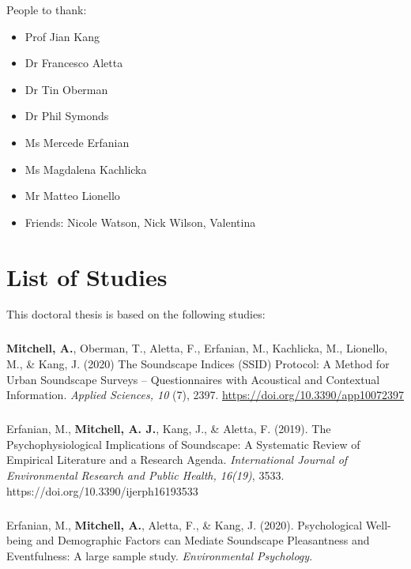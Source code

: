 \documentclass[oneside,fontsize=13pt,titlepage]{scrbook}
\begin{document}
People to thank:
\begin{itemize}
      \item Prof Jian Kang
      \item Dr Francesco Aletta
      \item Dr Tin Oberman
      \item Dr Phil Symonds
      \item Ms Mercede Erfanian
      \item Ms Magdalena Kachlicka
      \item Mr Matteo Lionello
      \item Friends: Nicole Watson, Nick Wilson, Valentina
\end{itemize}

\chapter*{List of Studies}

This doctoral thesis is based on the following studies:

\paragraph*{}
\textbf{Mitchell, A.}, Oberman, T., Aletta, F., Erfanian, M., Kachlicka, M., Lionello, M., \& Kang, J. (2020) The Soundscape Indices (SSID) Protocol: A Method for Urban Soundscape Surveys -- Questionnaires with Acoustical and Contextual Information. \emph{Applied Sciences, 10} (7), 2397. \url{https://doi.org/10.3390/app10072397}

\paragraph*{}
Erfanian, M., \textbf{Mitchell, A. J.}, Kang, J., \& Aletta, F. (2019). The Psychophysiological Implications of Soundscape: A Systematic Review of Empirical Literature and a Research Agenda. \emph{International Journal of Environmental Research and Public Health, 16(19)}, 3533. https://doi.org/10.3390/ijerph16193533

\paragraph*{}
Erfanian, M., \textbf{Mitchell, A.}, Aletta, F., \& Kang, J. (2020). Psychological Well-being and Demographic Factors can Mediate Soundscape Pleasantness and Eventfulness: A large sample study. \emph{Environmental Psychology}.
\end{document}
